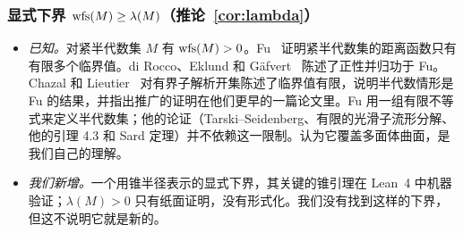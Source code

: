 \subsubsection*{显式下界 $\operatorname{wfs}(M)\ge\lambda(M)$（推论~\ref{cor:lambda}）}
\begin{itemize}
\item \emph{已知。}对紧半代数集 $M$ 有 $\operatorname{wfs}(M)>0$。Fu~\cite[\S5.3]{Fu85} 证明紧半代数集的距离函数只有有限多个临界值。di Rocco、Eklund 和 Gäfvert~\cite[Thm.~2.5]{dREG22} 陈述了正性并归功于 Fu。Chazal 和 Lieutier~\cite[Prop.~3.6]{ChazalLieutier07} 对有界子解析开集陈述了临界值有限，说明半代数情形是 Fu 的结果，并指出推广的证明在他们更早的一篇论文里。Fu 用一组有限不等式来定义半代数集；他的论证（Tarski--Seidenberg、有限的光滑子流形分解、他的引理 4.3 和 Sard 定理）并不依赖这一限制。认为它覆盖多面体曲面，是我们自己的理解。
\item \emph{我们新增。}一个用锥半径表示的显式下界，其关键的锥引理在 Lean~4 中机器验证；$\lambda(M)>0$ 只有纸面证明，没有形式化。我们没有找到这样的下界，但这不说明它就是新的。
\end{itemize}

